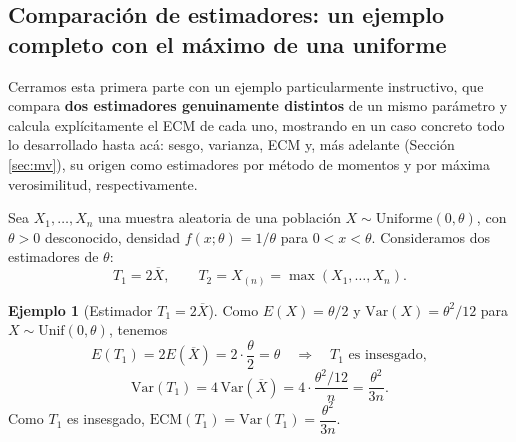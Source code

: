 \documentclass[11pt,a4paper]{article}
\theoremstyle{plain}
\theoremstyle{definition}
\newtheorem{ejemplo}[teorema]{Ejemplo}
\theoremstyle{remark}
\begin{document}
\subsection{Comparación de estimadores: un ejemplo completo con el máximo de una uniforme}
\label{sec:uniforme}

Cerramos esta primera parte con un ejemplo particularmente instructivo, que compara \textbf{dos estimadores genuinamente distintos} de un mismo parámetro y calcula explícitamente el ECM de cada uno, mostrando en un caso concreto todo lo desarrollado hasta acá: sesgo, varianza, ECM y, más adelante (Sección \ref{sec:mv}), su origen como estimadores por método de momentos y por máxima verosimilitud, respectivamente.

Sea $X_1,\dots,X_n$ una muestra aleatoria de una población $X\sim \text{Uniforme}(0,\theta)$, con $\theta>0$ desconocido, densidad $f(x;\theta)=1/\theta$ para $0<x<\theta$. Consideramos dos estimadores de $\theta$:
\[
T_1 = 2\overline X, \qquad T_2 = X_{(n)} = \max(X_1,\dots,X_n).
\]

\begin{ejemplo}[Estimador $T_1=2\overline X$]
Como $E(X)=\theta/2$ y $\mathrm{Var}(X)=\theta^2/12$ para $X\sim\text{Unif}(0,\theta)$, tenemos
\[
E(T_1) = 2E(\overline X) = 2\cdot\frac{\theta}{2}=\theta \quad\Rightarrow\quad T_1 \text{ es insesgado},
\]
\[
\mathrm{Var}(T_1) = 4\,\mathrm{Var}(\overline X) = 4\cdot\frac{\theta^2/12}{n} = \frac{\theta^2}{3n}.
\]
Como $T_1$ es insesgado, $\mathrm{ECM}(T_1)=\mathrm{Var}(T_1) = \dfrac{\theta^2}{3n}$.
\end{ejemplo}
\end{document}
